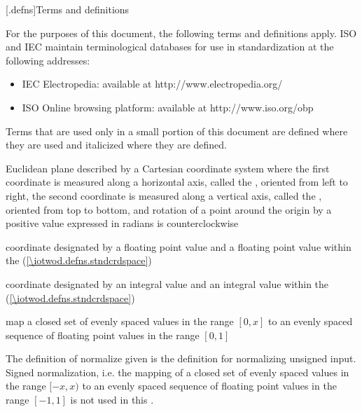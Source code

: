 
[\iotwod.defns]{Terms and definitions}

%
For the purposes of this document, the following terms and definitions apply.
ISO and IEC maintain terminological databases for use in standardization at the following addresses:
\begin{itemize}
\renewcommand{\labelitemi}{$\bullet$} %
\item IEC Electropedia: available at http://www.electropedia.org/
\item ISO Online browsing platform: available at http://www.iso.org/obp
\end{itemize}

\pnum
Terms that are used only in a small portion of this document are defined where they are used and italicized where they are defined.


%
Euclidean plane described by a Cartesian coordinate system where the first coordinate is measured along a horizontal axis, called the \xaxis, oriented from left to right, the second coordinate is measured along a vertical axis, called the \yaxis, oriented from top to bottom, and rotation of a point around the origin by a positive value expressed in radians is counterclockwise

%
 coordinate designated by a floating point \xaxis{} value and a floating point \yaxis{} value within the  (\ref{\iotwod.defns.stndcrdspace})

%
 coordinate designated by an integral \xaxis{} value and an integral \yaxis{} value within the  (\ref{\iotwod.defns.stndcrdspace})

%
map a closed set of evenly spaced values in the range $[0, x]$ to an evenly spaced sequence of floating point values in the range $[0, 1]$
\begin{note}
The definition of normalize given is the definition for normalizing unsigned input. Signed normalization, i.e. the mapping of a closed set of evenly spaced values in the range $[-x, x)$ to an evenly spaced sequence of floating point values in the range $[-1, 1]$ is not used in this \documenttypename{}.
\end{note}

